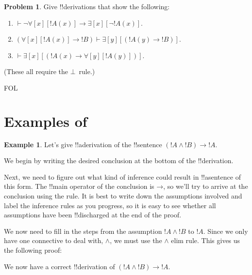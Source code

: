 \documentclass[10pt,a4paper]{article}
\theoremstyle{plain}
\theoremstyle{definition}
\newtheorem{ex}[thm]{Example}
\newtheorem{prob}{Problem}[section]
\theoremstyle{remark}
\newcommand*{\olfileid}[3]{}
\newcommand*{\olsection}[1]{\section*{#1}}
\providecommand{\AxiomC}[1]{}
\providecommand{\UnaryInfC}[1]{}
\providecommand{\RightLabel}[1]{}
\newenvironment{prooftree}{}{}
\providecommand{\lif}{\mathbin{\rightarrow}}
\providecommand{\lforall}{\mathord{\forall}}
\providecommand{\lexists}{\mathord{\exists}}
\providecommand{\Proves}{\mathrel{\vdash}}
\providecommand{\iftag}[1]{#1}
\providecommand{\Elim}[1]{}
\providecommand{\Intro}[1]{}
\providecommand{\Discharge}{\mathrm{Dis}}
\providecommand{\Intro}{\mathrm{I}}
\providecommand{\DischargeRule}{\mathrm{Dis}}
\providecommand{\FalseCl}{\bot}
\providecommand{\DischargeRule}{\mathrm{Dis}}
\providecommand{\FalseCl}{\bot}
\providecommand{\iftag}{}
\begin{document}
\begin{prob}
Give !!{derivation}s that show the following:
\begin{enumerate}
\item $\Proves \lnot\lforall[x][!A(x)] \lif \lexists[x][\lnot!A(x)]$.
\item $(\lforall[x][!A(x)] \lif !B) \Proves \lexists[y][(!A(y) \lif !B)]$.
\item $\Proves \lexists[x][(!A(x) \lif \lforall[y][!A(y)])]$.
\end{enumerate}
(These all require the $\FalseCl$~rule.)
\end{prob}





\iftag{FOL}
      {\olfileid{fol}{ntd}{pro}}
      {\olfileid{pl}{ntd}{pro}}

\olsection{Examples of }

\begin{ex}
Let's give !!a{derivation} of the !!{sentence} $(!A \land !B) \lif !A$.

We begin by writing the desired conclusion at the bottom of the 
!!{derivation}.
\begin{prooftree}
\AxiomC{}
\UnaryInfC{$(!A\land !B) \lif !A$}
\end{prooftree}

Next, we need to figure out what kind of inference could result in
!!a{sentence} of this form. The !!{main operator} of the
conclusion is $\lif$, so we'll try to arrive at the
conclusion using the \Intro{\lif} rule. It is best to write down
the assumptions involved and label the inference rules as you
progress, so it is easy to see whether all assumptions have been
!!{discharged} at the end of the proof.
\begin{prooftree}
\AxiomC{$\Discharge{!A \land !B}{1}$}
\DischargeRule{\Intro{\lif}}{1} 
\UnaryInfC{$(!A\land !B) \lif !A$}
\end{prooftree}

We now need to fill in the steps from the assumption $!A \land !B$ to $!A$.
Since we only have one connective to deal with, $\land$, we must
use the $\land$ elim rule. This gives us the following proof:
\begin{prooftree}
\AxiomC{$\Discharge{!A \land !B}{1}$}
\RightLabel{\Elim{\land}}
\UnaryInfC{$!A$}
\DischargeRule{\Intro{\lif}}{1} 
\UnaryInfC{$(!A\land !B) \lif !A$}
\end{prooftree}
We now have a correct !!{derivation} of $(!A \land
!B) \lif !A$.
\end{ex}
\end{document}
